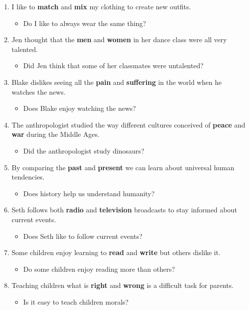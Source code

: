 \documentclass[authoryear]{elsarticle}
\begin{document}
\begin{enumerate}
\item I like to \textbf{match} and \textbf{mix} my clothing to create new outfits.	\begin{itemize} \item Do I like to always wear the same thing?\end{itemize}
\item Jen thought that the \textbf{men} and \textbf{women} in her dance class were all very talented.	\begin{itemize} \item Did Jen think that some of her classmates were untalented?\end{itemize}
\item Blake dislikes seeing all the \textbf{pain} and \textbf{suffering} in the world when he watches the news.	\begin{itemize} \item Does Blake enjoy watching the news?\end{itemize}
\item The anthropologist studied the way different cultures conceived of \textbf{peace} and \textbf{war} during the Middle Ages.	\begin{itemize} \item Did the anthropologist study dinosaurs?\end{itemize}
\item By comparing the \textbf{past} and \textbf{present} we can learn about universal human tendencies.	\begin{itemize} \item Does history help us understand humanity?\end{itemize}
\item Seth follows both \textbf{radio} and \textbf{television} broadcasts to stay informed about current events.	\begin{itemize} \item Does Seth like to follow current events?\end{itemize}
\item Some children enjoy learning to \textbf{read} and \textbf{write} but others dislike it.	\begin{itemize} \item Do some children enjoy reading more than others?\end{itemize}
\item Teaching children what is \textbf{right} and \textbf{wrong} is a difficult task for parents.	\begin{itemize} \item Is it easy to teach children morals?\end{itemize}

\end{enumerate}
\end{document}
